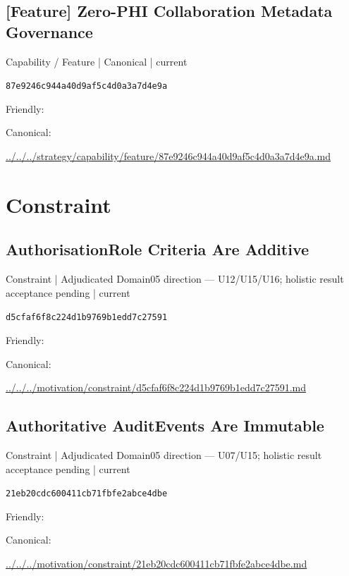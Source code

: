 \documentclass[10pt,a4paper]{article}
\begin{document}
\subsection*{[Feature] Zero-PHI Collaboration Metadata Governance}
{\small Capability / Feature | Canonical | current}\par
\texttt{87e9246c944a40d9af5c4d0a3a7d4e9a}\par
Friendly: \par
Canonical: \par
{\footnotesize\url{../../../strategy/capability/feature/87e9246c944a40d9af5c4d0a3a7d4e9a.md}}\par
\section*{Constraint}
\subsection*{AuthorisationRole Criteria Are Additive}
{\small Constraint | Adjudicated Domain05 direction — U12/U15/U16; holistic result acceptance pending | current}\par
\texttt{d5cfaf6f8c224d1b9769b1edd7c27591}\par
Friendly: \par
Canonical: \par
{\footnotesize\url{../../../motivation/constraint/d5cfaf6f8c224d1b9769b1edd7c27591.md}}\par
\subsection*{Authoritative AuditEvents Are Immutable}
{\small Constraint | Adjudicated Domain05 direction — U07/U15; holistic result acceptance pending | current}\par
\texttt{21eb20cdc600411cb71fbfe2abce4dbe}\par
Friendly: \par
Canonical: \par
{\footnotesize\url{../../../motivation/constraint/21eb20cdc600411cb71fbfe2abce4dbe.md}}\par
\end{document}
